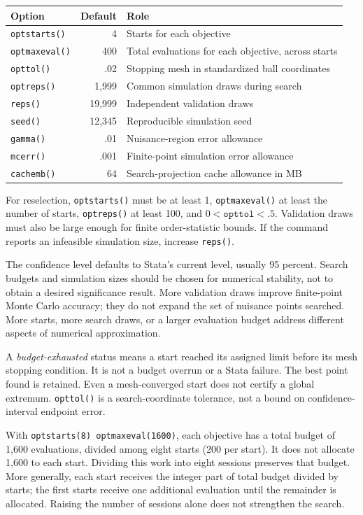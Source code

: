 \documentclass[11pt]{article}
\newcommand{\cmd}[1]{\texttt{#1}}
\begin{document}
\begin{tabularx}{\linewidth}{@{}lrX@{}}
\toprule
Option & Default & Role \\
\midrule
\cmd{optstarts()} & 4 & Starts for each objective \\
\cmd{optmaxeval()} & 400 & Total evaluations for each objective, across starts \\
\cmd{opttol()} & .02 & Stopping mesh in standardized ball coordinates \\
\cmd{optreps()} & 1,999 & Common simulation draws during search \\
\cmd{reps()} & 19,999 & Independent validation draws \\
\cmd{seed()} & 12,345 & Reproducible simulation seed \\
\cmd{gamma()} & .01 & Nuisance-region error allowance \\
\cmd{mcerr()} & .001 & Finite-point simulation error allowance \\
\cmd{cachemb()} & 64 & Search-projection cache allowance in MB \\
\bottomrule
\end{tabularx}

For reselection, \cmd{optstarts()} must be at least 1,
\cmd{optmaxeval()} at least the number of starts, \cmd{optreps()} at least
100, and $0<\texttt{opttol}<.5$. Validation draws must also be large enough
for finite order-statistic bounds. If the command reports an infeasible
simulation size, increase \cmd{reps()}.

The confidence level defaults to Stata's current level, usually 95 percent.
Search budgets and simulation sizes should be chosen for numerical stability,
not to obtain a desired significance result. More validation draws improve
finite-point Monte Carlo accuracy; they do not expand the set of nuisance
points searched. More starts, more search draws, or a larger evaluation budget
address different aspects of numerical approximation.

A \emph{budget-exhausted} status means a start reached its assigned limit
before its mesh stopping condition. It is not a budget overrun or a Stata
failure. The best point found is retained. Even a mesh-converged start does
not certify a global extremum. \cmd{opttol()} is a search-coordinate tolerance,
not a bound on confidence-interval endpoint error.

With \cmd{optstarts(8) optmaxeval(1600)}, each objective has a total budget
of 1,600 evaluations, divided among eight starts (200 per start). It does not
allocate 1,600 to each start. Dividing this work into eight sessions preserves
that budget. More generally, each start receives the integer part of total
budget divided by starts; the first starts receive one additional evaluation
until the remainder is allocated. Raising the number of sessions alone does
not strengthen the search.
\end{document}
